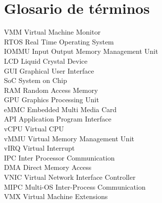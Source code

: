 \section{Glosario de términos}

VMM     Virtual Machine Monitor\\
RTOS    Real Time Operating System\\
IOMMU   Input Output Memory Management Unit\\
LCD     Liquid Crystal Device\\
GUI     Graphical User Interface\\
SoC     System on Chip\\
RAM     Random Access Memory\\
GPU     Graphics Processing Unit\\
eMMC    Embedded Multi Media Card\\
API     Application Program Interface\\
vCPU    Virtual CPU\\
vMMU    Virtual Memory Management Unit\\
vIRQ    Virtual Interrupt\\
IPC     Inter Processor Communication\\
DMA     Direct Memory Access\\
VNIC    Virtual Network Interface Controller\\
MIPC    Multi-OS Inter-Process Communication\\
VMX     Virtual Machine Extensions\\

\newpage
